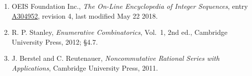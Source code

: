 \documentclass[11pt]{article}
\theoremstyle{definition}
\begin{document}
\begin{enumerate}

\item OEIS Foundation Inc., \emph{The On-Line Encyclopedia of Integer Sequences}, entry \href{https://oeis.org/A304952}{A304952}, revision 4, last modified May 22 2018.

\item R. P. Stanley, \emph{Enumerative Combinatorics}, Vol.~1, 2nd ed., Cambridge University Press, 2012; \S4.7.

\item J. Berstel and C. Reutenauer, \emph{Noncommutative Rational Series with Applications}, Cambridge University Press, 2011.

\end{enumerate}
\end{document}
